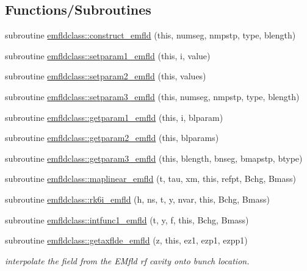 \subsection*{Functions/\+Subroutines}
\begin{DoxyCompactItemize}
\item 
subroutine \mbox{\hyperlink{namespaceemfldclass_a2a7e6a32e149f3dc82fbbc59d5c6ec2d}{emfldclass\+::construct\+\_\+emfld}} (this, numseg, nmpstp, type, blength)
\item 
subroutine \mbox{\hyperlink{namespaceemfldclass_a89c21ffdad41e63e575b3bc21899f600}{emfldclass\+::setparam1\+\_\+emfld}} (this, i, value)
\item 
subroutine \mbox{\hyperlink{namespaceemfldclass_ad425987a9a6e1cb7b0b2b7b1724dc961}{emfldclass\+::setparam2\+\_\+emfld}} (this, values)
\item 
subroutine \mbox{\hyperlink{namespaceemfldclass_a3f40c1b18d4a7a28ceea11a3a6b350ad}{emfldclass\+::setparam3\+\_\+emfld}} (this, numseg, nmpstp, type, blength)
\item 
subroutine \mbox{\hyperlink{namespaceemfldclass_ae0e0b406ff0837e878753ad73fc1862d}{emfldclass\+::getparam1\+\_\+emfld}} (this, i, blparam)
\item 
subroutine \mbox{\hyperlink{namespaceemfldclass_af928aa17c18a7ebd339aece97387154b}{emfldclass\+::getparam2\+\_\+emfld}} (this, blparams)
\item 
subroutine \mbox{\hyperlink{namespaceemfldclass_a07a0d1aa7a4dc67bcec915f0d5d0945e}{emfldclass\+::getparam3\+\_\+emfld}} (this, blength, bnseg, bmapstp, btype)
\item 
subroutine \mbox{\hyperlink{namespaceemfldclass_ab283b339abd3df592d8200c244652131}{emfldclass\+::maplinear\+\_\+emfld}} (t, tau, xm, this, refpt, Bchg, Bmass)
\item 
subroutine \mbox{\hyperlink{namespaceemfldclass_ae4bfa1325df7cec4a3facbe8ebc66845}{emfldclass\+::rk6i\+\_\+emfld}} (h, ns, t, y, nvar, this, Bchg, Bmass)
\item 
subroutine \mbox{\hyperlink{namespaceemfldclass_af90bd5467acb5c62a2d93f6eb1738097}{emfldclass\+::intfunc1\+\_\+emfld}} (t, y, f, this, Bchg, Bmass)
\item 
subroutine \mbox{\hyperlink{namespaceemfldclass_a2b0b3e7b6537f3a6ea857f99288186ef}{emfldclass\+::getaxflde\+\_\+emfld}} (z, this, ez1, ezp1, ezpp1)
\begin{DoxyCompactList}\small\item\em interpolate the field from the E\+Mfld rf cavity onto bunch location. \end{DoxyCompactList}\item 

\end{DoxyCompactItemize}

